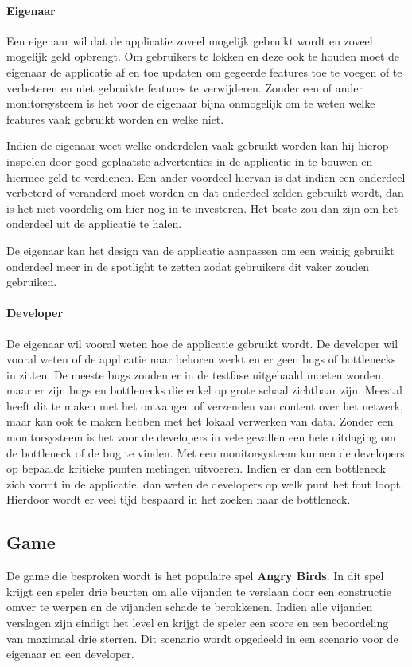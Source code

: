 \paragraph{Eigenaar}
Een eigenaar wil dat de applicatie zoveel mogelijk gebruikt wordt en zoveel mogelijk geld opbrengt. Om gebruikers te lokken en deze ook te houden moet de eigenaar de applicatie af en toe updaten om gegeerde features toe te voegen of te verbeteren en niet gebruikte features te verwijderen. Zonder een of ander monitorsysteem is het voor de eigenaar bijna onmogelijk om te weten welke features vaak gebruikt worden en welke niet. 

Indien de eigenaar weet welke onderdelen vaak gebruikt worden kan hij hierop inspelen door goed geplaatste advertenties in de applicatie in te bouwen en hiermee geld te verdienen. Een ander voordeel hiervan is dat indien een onderdeel verbeterd of veranderd moet worden en dat onderdeel zelden gebruikt wordt, dan is het niet voordelig om hier nog in te investeren. Het beste zou dan zijn om het onderdeel uit de applicatie te halen. 

De eigenaar kan het design van de applicatie aanpassen om een weinig gebruikt onderdeel meer in de spotlight te zetten zodat gebruikers dit vaker zouden gebruiken. \\


\paragraph{Developer}
De eigenaar wil vooral weten hoe de applicatie gebruikt wordt. De developer wil vooral weten of de applicatie naar behoren werkt en er geen bugs of bottlenecks in zitten. De meeste bugs zouden er in de testfase uitgehaald moeten worden, maar er zijn bugs en bottlenecks die enkel op grote schaal zichtbaar zijn. Meestal heeft dit te maken met het ontvangen of verzenden van content over het netwerk, maar kan ook te maken hebben met het lokaal verwerken van data. Zonder een monitorsysteem is het voor de developers in vele gevallen een hele uitdaging om de bottleneck of de bug te vinden. Met een monitorsysteem kunnen de developers op bepaalde kritieke punten metingen uitvoeren. Indien er dan een bottleneck zich vormt in de applicatie, dan weten de developers op welk punt het fout loopt. Hierdoor wordt er veel tijd bespaard in het zoeken naar de bottleneck. \\



\subsection{Game}
De game die besproken wordt is het populaire spel \textbf{Angry Birds}. In dit spel krijgt een speler drie beurten om alle vijanden te verslaan door een constructie omver te werpen en de vijanden schade te berokkenen. Indien alle vijanden verslagen zijn eindigt het level en krijgt de speler een score en een beoordeling van maximaal drie sterren. Dit scenario wordt opgedeeld in een scenario voor de eigenaar en een developer.

